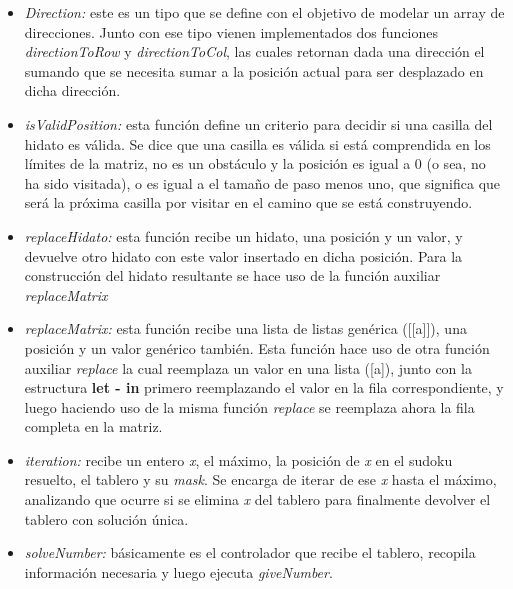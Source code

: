 \documentclass[10pt]{amsart}
\begin{document}
\begin{itemize}
        \item \textit{Direction:} este es un tipo que se define con el objetivo de modelar un array de direcciones. Junto con ese tipo vienen implementados dos funciones \textit{directionToRow} y \textit{directionToCol}, las cuales retornan dada una direcci\'on el sumando que se necesita sumar a la posici\'on actual para ser desplazado en dicha direcci\'on.

        \newpage
                      
        \item \textit{isValidPosition:} esta funci\'on define un criterio para decidir si una casilla del hidato es v\'alida. Se dice que una casilla es v\'alida si est\'a comprendida en los l\'imites de la matriz, no es un obst\'aculo y la posici\'on es igual a 0 (o sea, no ha sido visitada), o es igual a el tama\~no de paso menos uno, que significa que ser\'a la pr\'oxima casilla por visitar en el camino que se est\'a construyendo. 
                
        \item \textit{replaceHidato:} esta funci\'on recibe un hidato, una posici\'on y un valor, y devuelve otro hidato con este valor insertado en dicha posici\'on. Para la construcci\'on del hidato resultante se hace uso de la funci\'on auxiliar \textit{replaceMatrix}

        \item \textit{replaceMatrix:} esta funci\'on recibe una lista de listas gen\'erica ([[a]]), una posici\'on y un valor gen\'erico tambi\'en. Esta funci\'on hace uso de otra funci\'on auxiliar \textit{replace} la cual reemplaza un valor en una lista ([a]), junto con la estructura \textbf{let - in} primero reemplazando el valor en la fila correspondiente, y luego haciendo uso de la misma funci\'on \textit{replace} se reemplaza ahora la fila completa en la matriz.
        
        \item \textit{iteration:} recibe un entero \textit{x}, el m\'aximo, la posici\'on de \textit{x} en el sudoku resuelto, el tablero y su \textit{mask}. Se encarga de iterar de ese \textit{x} hasta el m\'aximo, analizando que ocurre si se elimina \textit{x} del tablero para finalmente devolver el tablero con soluci\'on \'unica.
        
        \item \textit{solveNumber:} b\'asicamente es el controlador que recibe el tablero, recopila informaci\'on necesaria y luego ejecuta \textit{giveNumber}.
        

\end{itemize}
\end{document}
